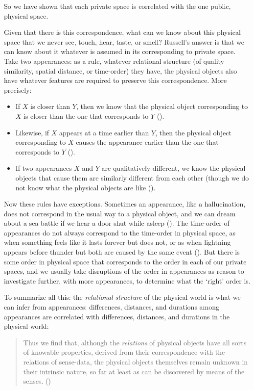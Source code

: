 \documentclass[oneside,letterpaper,12pt]{book}
\begin{document}
So we have shown that each private space is correlated with the one public, physical space.
\par Given that there is this correspondence, what can we know about this physical space that we never see, touch, hear, taste, or smell? Russell's answer is that we can know about it whatever is assumed in its corresponding to private space. Take two appearances: as a rule, whatever relational structure (of quality similarity, spatial distance, or time-order) they have, the physical objects also have whatever features are required to preserve this correspondence. More precisely:
\begin{itemize}
	\item If $X$ is closer than $Y$, then we know that the physical object corresponding to $X$ is closer than the one that corresponds to $Y$ (\pageref{distance}). 
	\item Likewise, if $X$ appears at a time earlier than $Y$, then the physical object corresponding to $X$ causes the appearance earlier than the one that corresponds to $Y$ (\pageref{timeorder}).
	\item If two appearances $X$ and $Y$ are qualitatively different, we know the physical objects that cause them are similarly different from each other (though we do not know what the physical objects are like (\pageref{similarity}).
\end{itemize}
Now these rules have exceptions. Sometimes an appearance, like a hallucination, does not correspond in the usual way to a physical object, and we can dream about a sea battle if we hear a door shut while asleep (\pageref{navy}). The time-order of appearances do not always correspond to the time-order in physical space, as when something feels like it lasts forever but does not, or as when lightning appears before thunder but both are caused by the same event (\pageref{thunder}). But there is some order in physical space that corresponds to the order in each of our private spaces, and we usually take disruptions of the order in appearances as reason to investigate further, with more appearances, to determine what the `right' order is. 
\par To summarize all this: the \textit{relational structure} of the physical world is what we can infer from appearances: differences, distances, and durations among appearances are correlated with differences, distances, and durations in the physical world:
\begin{quote} 
	Thus we find that, although the \textit{relations} of physical objects have all sorts of knowable properties, derived from their correspondence with the relations of sense-data, the physical objects themselves remain unknown in their intrinsic nature, so far at least as can be discovered by means of the senses. (\pageref{relations})
\end{quote}
\end{document}

